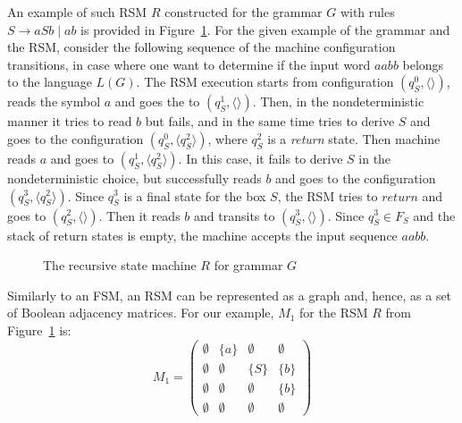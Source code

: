 An example of such RSM $R$ constructed for the grammar $G$ with rules $S \to a S b \mid a b$ is provided in Figure~\ref{example:automata}.
For the given example of the grammar and the RSM, consider the following sequence of the machine configuration transitions, in case where one want to determine if the input word $aabb$ belongs to the language $L(G)$.
The RSM execution starts from configuration $(q_S^0,\langle \rangle)$, reads the symbol $a$ and goes the to $(q_S^1, \langle \rangle)$.
Then, in the nondeterministic manner it tries to read $b$ but fails, and in the same time tries to derive $S$ and goes to the configuration $(q_S^0, \langle q_S^2 \rangle)$, where $q_S^2$ is a \textit{return} state.
Then machine reads $a$ and goes to $(q_S^1, \langle q_S^2 \rangle)$. In this case, it fails to derive $S$ in the nondeterministic choice, but successfully reads $b$ and goes to the configuration $(q_S^3,\langle q_S^2 \rangle)$.
Since $q_S^3$ is a final state for the box $S$, the RSM tries to $return$ and goes to $(q_S^2,\langle \rangle)$.
Then it reads $b$ and transits to $(q_S^3,\langle \rangle)$.
Since $q_S^3 \in F_S$ and the stack of return states is empty, the machine accepts the input sequence $aabb$.
\begin{figure}[h]
    \centering
    \caption{The recursive state machine $R$ for grammar $G$}
    \label{example:automata}
\end{figure}


Similarly to an FSM, an RSM can be represented as a graph and, hence, as a set of Boolean adjacency matrices.
For our example, $M_1$ for the RSM $R$ from Figure~\ref{example:automata} is:
    $$
    M_1 =
    \begin{pmatrix}
    \emptyset & \{a\} &   \emptyset &  \emptyset     \\
     \emptyset &  \emptyset & \{S\} & \{b\} \\
     \emptyset &  \emptyset &  \emptyset & \{b\}     \\
     \emptyset &  \emptyset &   \emptyset&   \emptyset
    \end{pmatrix}
    $$

